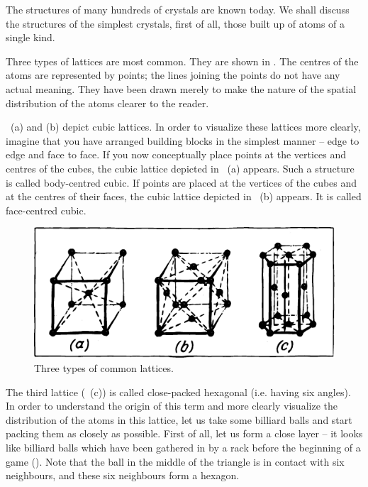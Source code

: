 The structures of many hundreds of crystals are known today. We shall discuss the structures of the simplest crys­tals, first of all, those built up of atoms of a single kind.

Three types of lattices are most common. They are shown in . The centres of the atoms are repre­sented by points; the lines joining the points do not have any actual meaning. They have been drawn merely to make the nature of the spatial distribution of the atoms clearer to the reader.

~\textcolor{black!70}{(a)} and \textcolor{black!70}{(b)} depict cubic lattices. In order to visualize these lattices more clearly, imagine that you have arranged building blocks in the simplest manner -- edge to edge and face to face. If you now conceptually place points at the vertices and centres of the cubes, the cubic lattice depicted in ~\textcolor{black!70}{(a)} appears. Such a structure is called body-centred cubic. If points are placed at the vertices of the cubes and at the centres of their faces, the cubic lattice depicted in ~\textcolor{black!70}{(b)} appears. It is called face-centred cubic.


\begin{figure}[!ht]
\centering
\includegraphics[width=\textwidth]{figures/fig-02-15.pdf}
\caption{Three types of common lattices.}
\label{fig-2.15}
\end{figure}

The third lattice (~\textcolor{black!70}{(c)}) is called close-packed hexagonal (i.e. having six angles). In order to understand the origin of this term and more clearly visualize the distribution of the atoms in this lattice, let us take some billiard balls and start packing them as closely as pos­sible. First of all, let us form a close layer -- it looks like billiard balls which have been gathered in by a rack before the beginning of a game (). Note that the ball in the middle of the triangle is in contact with six neighbours, and these six neighbours form a hexagon.

